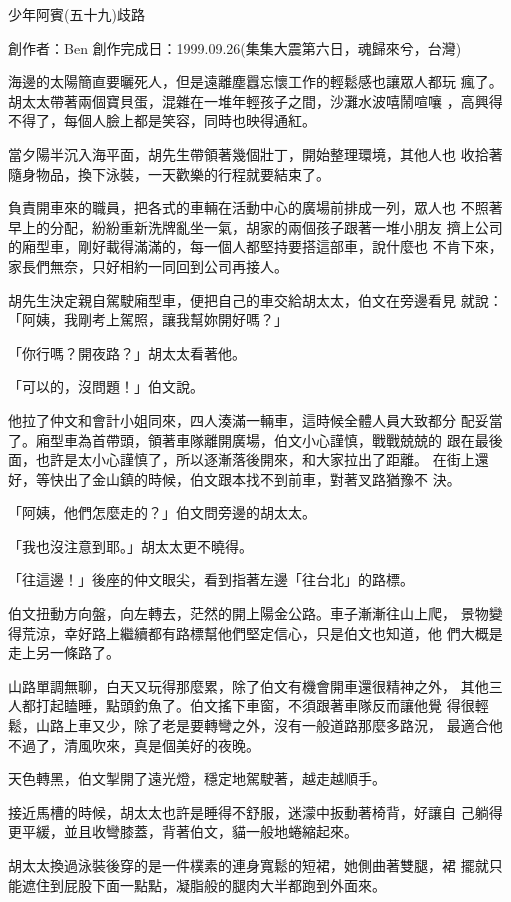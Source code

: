 



少年阿賓(五十九)歧路

創作者：Ben
創作完成日：1999.09.26(集集大震第六日，魂歸來兮，台灣)


海邊的太陽簡直要曬死人，但是遠離塵囂忘懷工作的輕鬆感也讓眾人都玩
瘋了。胡太太帶著兩個寶貝蛋，混雜在一堆年輕孩子之間，沙灘水波嘻鬧喧嚷
，高興得不得了，每個人臉上都是笑容，同時也映得通紅。

當夕陽半沉入海平面，胡先生帶領著幾個壯丁，開始整理環境，其他人也
收拾著隨身物品，換下泳裝，一天歡樂的行程就要結束了。

負責開車來的職員，把各式的車輛在活動中心的廣場前排成一列，眾人也
不照著早上的分配，紛紛重新洗牌亂坐一氣，胡家的兩個孩子跟著一堆小朋友
擠上公司的廂型車，剛好載得滿滿的，每一個人都堅持要搭這部車，說什麼也
不肯下來，家長們無奈，只好相約一同回到公司再接人。

胡先生決定親自駕駛廂型車，便把自己的車交給胡太太，伯文在旁邊看見
就說：「阿姨，我剛考上駕照，讓我幫妳開好嗎？」

「你行嗎？開夜路？」胡太太看著他。

「可以的，沒問題！」伯文說。

他拉了仲文和會計小姐同來，四人湊滿一輛車，這時候全體人員大致都分
配妥當了。廂型車為首帶頭，領著車隊離開廣場，伯文小心謹慎，戰戰兢兢的
跟在最後面，也許是太小心謹慎了，所以逐漸落後開來，和大家拉出了距離。
在街上還好，等快出了金山鎮的時候，伯文跟本找不到前車，對著叉路猶豫不
決。

「阿姨，他們怎麼走的？」伯文問旁邊的胡太太。

「我也沒注意到耶。」胡太太更不曉得。

「往這邊！」後座的仲文眼尖，看到指著左邊「往台北」的路標。

伯文扭動方向盤，向左轉去，茫然的開上陽金公路。車子漸漸往山上爬，
景物變得荒涼，幸好路上繼續都有路標幫他們堅定信心，只是伯文也知道，他
們大概是走上另一條路了。

山路單調無聊，白天又玩得那麼累，除了伯文有機會開車還很精神之外，
其他三人都打起瞌睡，點頭釣魚了。伯文搖下車窗，不須跟著車隊反而讓他覺
得很輕鬆，山路上車又少，除了老是要轉彎之外，沒有一般道路那麼多路況，
最適合他不過了，清風吹來，真是個美好的夜晚。

天色轉黑，伯文掣開了遠光燈，穩定地駕駛著，越走越順手。

接近馬槽的時候，胡太太也許是睡得不舒服，迷濛中扳動著椅背，好讓自
己躺得更平緩，並且收彎膝蓋，背著伯文，貓一般地蜷縮起來。

胡太太換過泳裝後穿的是一件樸素的連身寬鬆的短裙，她側曲著雙腿，裙
擺就只能遮住到屁股下面一點點，凝脂般的腿肉大半都跑到外面來。

